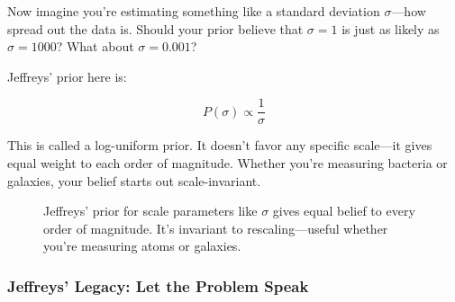 Now imagine you're estimating something like a standard deviation \( \sigma \)—how spread out the data is. Should your prior believe that \( \sigma = 1 \) is just as likely as \( \sigma = 1000 \)? What about \( \sigma = 0.001 \)?

Jeffreys' prior here is:

\[
P(\sigma) \propto \frac{1}{\sigma}
\]

This is called a log-uniform prior. It doesn’t favor any specific scale—it gives equal weight to each order of magnitude. Whether you’re measuring bacteria or galaxies, your belief starts out scale-invariant.

\begin{figure}[H]
\centering
{}
\caption{Jeffreys’ prior for scale parameters like \( \sigma \) gives equal belief to every order of magnitude. It's invariant to rescaling—useful whether you're measuring atoms or galaxies.}
\end{figure}







\subsubsection{Jeffreys’ Legacy: Let the Problem Speak}

